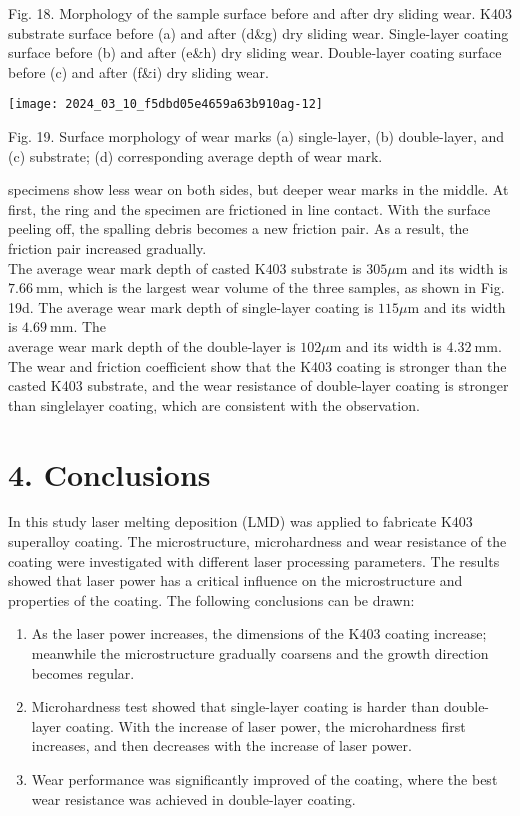 \documentclass[10pt]{article}
\begin{document}
Fig. 18. Morphology of the sample surface before and after dry sliding wear. K403 substrate surface before (a) and after (d\&g) dry sliding wear. Single-layer coating surface before (b) and after (e\&h) dry sliding wear. Double-layer coating surface before (c) and after (f\&i) dry sliding wear.

\begin{center}
\texttt{[image: 2024\_03\_10\_f5dbd05e4659a63b910ag-12]}
\end{center}

Fig. 19. Surface morphology of wear marks (a) single-layer, (b) double-layer, and (c) substrate; (d) corresponding average depth of wear mark.

specimens show less wear on both sides, but deeper wear marks in the middle. At first, the ring and the specimen are frictioned in line contact. With the surface peeling off, the spalling debris becomes a new friction pair. As a result, the friction pair increased gradually.\\
The average wear mark depth of casted $\mathrm{K} 403$ substrate is $305 \mu \mathrm{m}$ and its width is $7.66 \mathrm{~mm}$, which is the largest wear volume of the three samples, as shown in Fig. 19d. The average wear mark depth of single-layer coating is $115 \mu \mathrm{m}$ and its width is $4.69 \mathrm{~mm}$. The\\
average wear mark depth of the double-layer is $102 \mu \mathrm{m}$ and its width is $4.32 \mathrm{~mm}$. The wear and friction coefficient show that the K403 coating is stronger than the casted K403 substrate, and the wear resistance of double-layer coating is stronger than singlelayer coating, which are consistent with the observation.

\section*{4. Conclusions}
In this study laser melting deposition (LMD) was applied to fabricate K403 superalloy coating. The microstructure, microhardness and wear resistance of the coating were investigated with different laser processing parameters. The results showed that laser power has a critical influence on the microstructure and properties of the coating. The following conclusions can be drawn:

\begin{enumerate}
  \item As the laser power increases, the dimensions of the $\mathrm{K} 403$ coating increase; meanwhile the microstructure gradually coarsens and the growth direction becomes regular.

  \item Microhardness test showed that single-layer coating is harder than double-layer coating. With the increase of laser power, the microhardness first increases, and then decreases with the increase of laser power.

  \item Wear performance was significantly improved of the coating, where the best wear resistance was achieved in double-layer coating.

\end{enumerate}
\end{document}
